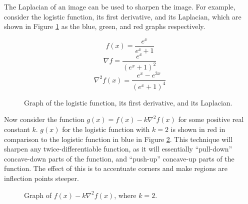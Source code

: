 \documentclass[12pt]{article}
\begin{document}
The Laplacian of an image can be used to sharpen the image. For example, consider the logistic function, its first derivative, and its Laplacian, which are shown in Figure \ref{fig:laplacian} as the blue, green, and red graphs respectively.

\[f(x) = \frac{e^x}{e^x + 1}\]
\[\nabla{f} = \frac{e^x}{(e^x + 1)^2}\]
\[\nabla^2f(x) = \frac{e^x - e^{3x}}{(e^x + 1)^4}\]

\begin{figure}[ht!]
    \centering
\caption{Graph of the logistic function, its first derivative, and its Laplacian.}
\label{fig:laplacian}
\end{figure}

Now consider the function $g(x) = f(x) - k\nabla^2f(x)$ for some positive real constant $k$. $g(x)$ for the logistic function with $k=2$ is shown in red in comparison to the logistic function in blue in Figure \ref{fig:laplacian-sharpening}. This technique will sharpen any twice-differentiable function, as it will essentially ``pull-down'' concave-down parts of the function, and ``push-up'' concave-up parts of the function. The effect of this is to accentuate corners and make regions are inflection points steeper.

\begin{figure}[ht!]
    \centering
\caption{Graph of $f(x) - k\nabla^2f(x)$, where $k=2$.}
\label{fig:laplacian-sharpening}
\end{figure}
\end{document}
